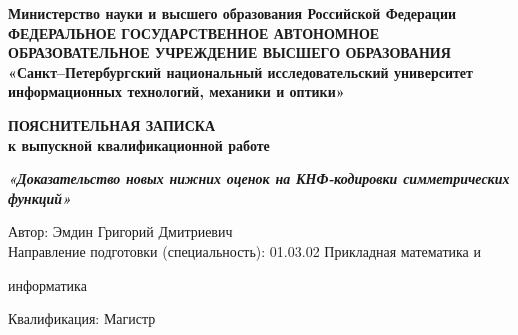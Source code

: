 \begin{titlepage}
\begin{center}

\textbf{Министерство науки и высшего образования Российской Федерации \\ \scriptsize ФЕДЕРАЛЬНОЕ ГОСУДАРСТВЕННОЕ АВТОНОМНОЕ ОБРАЗОВАТЕЛЬНОЕ УЧРЕЖДЕНИЕ ВЫСШЕГО ОБРАЗОВАНИЯ}
\textbf{\large «Санкт--Петербургский национальный исследовательский университет информационных технологий, механики и оптики»}\\



\vspace{10mm}

\textbf{\large ПОЯСНИТЕЛЬНАЯ ЗАПИСКА \\к выпускной квалификационной работе}\\

\vspace{20mm}

\textbf{\textit{\large «Доказательство новых нижних оценок на КНФ-кодировки симметрических функций»}}

\vspace{20mm}




\begin{flushright}
	\begin{minipage}{0.87\textwidth}
		\small
		Автор: Эмдин Григорий Дмитриевич	\hfill  \underline{\hspace{3.7cm}} \\
		Направление подготовки (специальность): 01.03.02 Прикладная математика и

		\qquad \qquad \qquad \qquad \qquad \qquad \qquad \qquad \qquad информатика
		
		
		Квалификация: Магистр\\
		

\end{minipage}
\end{flushright}
\end{center}
\end{titlepage}
